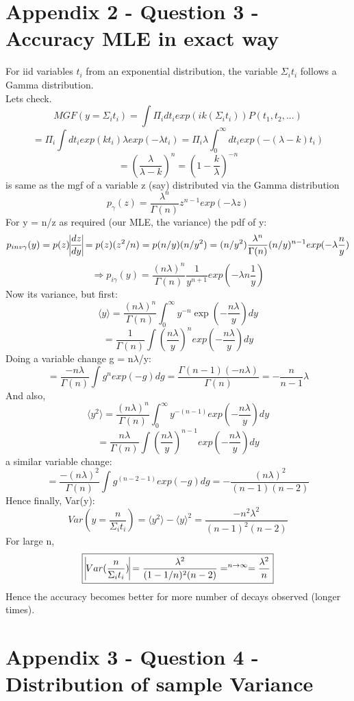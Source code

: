 \documentclass[11pt]{article}
\begin{document}
	
	
	
	
	
	
	\pagebreak
	\section{\color{red} Appendix 2 - Question 3 - Accuracy MLE in exact way}
	
		
	For iid variables $t_i$ from an exponential distribution, the variable $\Sigma_i t_i$ follows a Gamma distribution.\\
	Lets check.
	\[
	MGF(y= \Sigma_i t_i) = \int \Pi_i  dt_i exp(ik(\Sigma_i t_i)) P(t_1, t_2, ...)
	\]
	\[	
	= \Pi_i \int dt_i exp(kt_i) \lambda exp(-\lambda t_i) = \Pi_i \lambda \int_0^\infty dt_i exp(-(\lambda - k)t_i)
	\] 
	\[
	= (\frac{\lambda}{\lambda - k})^n = (1-\frac{k}{\lambda})^{-n} 
	\]
	is same as the mgf of a variable z (say) distributed via the Gamma distribution
	\[
	p_\gamma(z) = \frac{\lambda^n}{\Gamma(n)} z^{n-1} exp(-\lambda z)
	\]
	For y = n/z as required (our MLE, the variance) the pdf of y:
	\[
	p_{inv \gamma}(y) = p(z) \vline \frac{dz}{dy} \vline = p(z) (z^2/n) = p(n/y) (n/y^2) = (n/y^2) \frac{\lambda^n}{\Gamma(n)} (n/y)^{n-1} exp(-\lambda \frac{n}{y}) 
	\]
	\[
	\Rightarrow p_{i\gamma }(y) = \frac{(n\lambda)^n}{\Gamma(n)} \frac{1}{y^{n+1}} exp(-\lambda n \frac{1}{y})
	\]
	Now its variance, but first:
	\[
	\langle y \rangle  = \frac{(n\lambda)^n}{\Gamma(n)} \int_0^\infty y^{-n} \exp(-\frac{n\lambda }{y})dy
	\]
	\[
	= \frac{1}{\Gamma(n)}\int (\frac{n\lambda}{y})^n exp(-\frac{n\lambda}{y}) dy
	\]
	Doing a variable change g = n$\lambda$/y:
	\[
	= \frac{-n\lambda}{\Gamma(n)}\int g^n exp(-g) dg  =  \frac{\Gamma(n-1)(-n\lambda)}{\Gamma(n)} = - \frac{n}{n-1}\lambda
	\]
	And also,
	\[
	\langle y^2 \rangle  = \frac{(n\lambda)^n}{\Gamma(n)} \int_0^\infty y^{-(n-1)} exp(-\frac{n\lambda}{y}) dy 
	\]
	\[
	= \frac{n\lambda}{\Gamma(n)}\int (\frac{n\lambda}{y})^{n-1} exp(-\frac{n\lambda}{y}) dy 
	\]
	a similar variable change:
	\[
	= \frac{-(n\lambda)^2}{\Gamma(n)}\int g^{(n-2-1)}exp(-g)dg = -\frac{(n\lambda)^2}{(n-1)(n-2)}
	\]
	Hence finally, Var(y):
	\[
	Var(y = \frac{n}{\Sigma_i t_i}) = \langle y^2\rangle - \langle y \rangle^2 =  \frac{-n^2\lambda^2}{(n-1)^2 (n-2)}
	\]
	For large n,
	\[
	\boxed{\vline Var(\frac{n}{\Sigma_i t_i}) \vline =  \frac{\lambda^2}{(1-1/n)^2 (n-2)}  =^{n\rightarrow\infty} = \frac{\lambda^2}{n}}
	\]
	Hence the accuracy becomes better for more number of decays observed (longer times).
	
	\pagebreak	
	\section{\color{red} Appendix 3 - Question 4  - Distribution of sample Variance}
\end{document}
